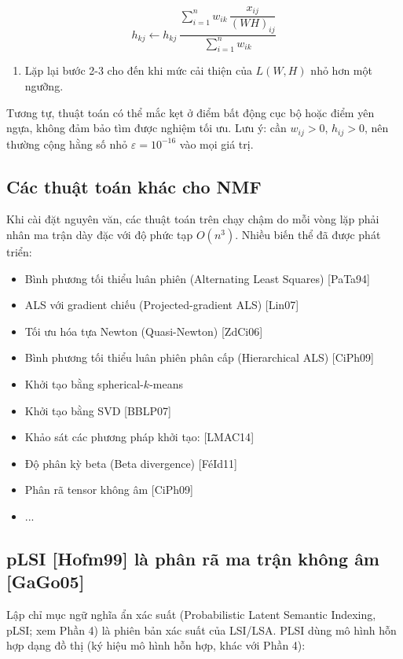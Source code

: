 \[h_{kj} \leftarrow h_{kj}\,\frac{\sum_{i=1}^{n} w_{ik}\,\dfrac{x_{ij}}{(WH)_{ij}}}{\sum_{i=1}^{n} w_{ik}}\]

\begin{enumerate}
\def\labelenumi{\arabic{enumi}.}
\setcounter{enumi}{3}
\item
  Lặp lại bước 2-3 cho đến khi mức cải thiện của \(L(W,H)\) nhỏ hơn một ngưỡng.
\end{enumerate}

Tương tự, thuật toán có thể mắc kẹt ở điểm bất động cục bộ hoặc điểm yên ngựa, không đảm bảo tìm được nghiệm tối ưu. Lưu ý: cần \(w_{ij} > 0\), \(h_{ij} > 0\), nên thường cộng hằng số nhỏ \(\varepsilon = 10^{-16}\) vào mọi giá trị.

\subsection{Các thuật toán khác cho NMF}

Khi cài đặt nguyên văn, các thuật toán trên chạy chậm do mỗi vòng lặp phải nhân ma trận dày đặc với độ phức tạp \(O(n^3)\). Nhiều biến thể đã được phát triển:

\begin{itemize}
\item
  Bình phương tối thiểu luân phiên (Alternating Least Squares) {[}PaTa94{]}
\item
  ALS với gradient chiếu (Projected-gradient ALS) {[}Lin07{]}
\item
  Tối ưu hóa tựa Newton (Quasi-Newton) {[}ZdCi06{]}
\item
  Bình phương tối thiểu luân phiên phân cấp (Hierarchical ALS) {[}CiPh09{]}
\item
  Khởi tạo bằng spherical-\(k\)-means
\item
  Khởi tạo bằng SVD {[}BBLP07{]}
\item
  Khảo sát các phương pháp khởi tạo: {[}LMAC14{]}
\item
  Độ phân kỳ beta (Beta divergence) {[}FéId11{]}
\item
  Phân rã tensor không âm {[}CiPh09{]}
\item
  ...
\end{itemize}

\subsection{pLSI {[}Hofm99{]} là phân rã ma trận không âm {[}GaGo05{]}}

Lập chỉ mục ngữ nghĩa ẩn xác suất (Probabilistic Latent Semantic Indexing, pLSI; xem Phần 4) là phiên bản xác suất của LSI/LSA. PLSI dùng mô hình hỗn hợp dạng đồ thị (ký hiệu mô hình hỗn hợp, khác với Phần 4):

